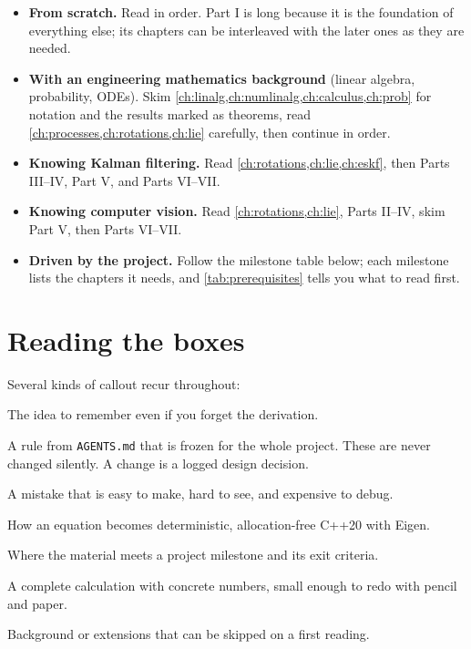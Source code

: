 \begin{itemize}
  \item \textbf{From scratch.} Read in order. Part I is long because it is the foundation of everything else; its
        chapters can be interleaved with the later ones as they are needed.
  \item \textbf{With an engineering mathematics background} (linear algebra, probability, ODEs). Skim
        \cref{ch:linalg,ch:numlinalg,ch:calculus,ch:prob} for notation and the results marked as theorems, read
        \cref{ch:processes,ch:rotations,ch:lie} carefully, then continue in order.
  \item \textbf{Knowing Kalman filtering.} Read \cref{ch:rotations,ch:lie,ch:eskf}, then Parts III--IV, Part V, and Parts VI--VII.
  \item \textbf{Knowing computer vision.} Read \cref{ch:rotations,ch:lie}, Parts II--IV, skim Part V, then Parts VI--VII.
  \item \textbf{Driven by the project.} Follow the milestone table below; each milestone lists the chapters it needs, and
        \cref{tab:prerequisites} tells you what to read first.
\end{itemize}

\section*{Reading the boxes}

Several kinds of callout recur throughout:

\begin{keyidea}
The idea to remember even if you forget the derivation.
\end{keyidea}
\begin{convention}
A rule from \texttt{AGENTS.md} that is frozen for the whole project. These are never changed
silently. A change is a logged design decision.
\end{convention}
\begin{pitfall}
A mistake that is easy to make, hard to see, and expensive to debug.
\end{pitfall}
\begin{implnote}
How an equation becomes deterministic, allocation-free C++20 with Eigen.
\end{implnote}
\begin{projectlink}[Milestone N]
Where the material meets a project milestone and its exit criteria.
\end{projectlink}
\begin{worked}
A complete calculation with concrete numbers, small enough to redo with pencil and paper.
\end{worked}
\begin{aside}
Background or extensions that can be skipped on a first reading.
\end{aside}

